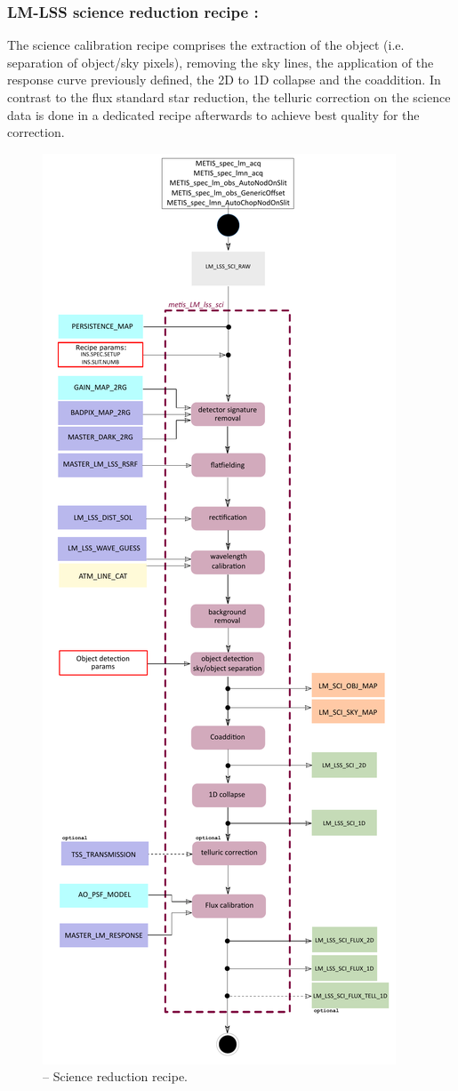 \subsubsection{LM-LSS science reduction recipe :}\label{rec:lsslmsci}
The science calibration recipe comprises the extraction of the object (i.e. separation of object/sky pixels), removing the sky lines, the application of the response curve previously defined, the 2D to 1D collapse and the coaddition. In contrast to the flux standard star reduction, the telluric correction on the science data is done in a dedicated recipe afterwards to achieve best quality for the correction.
\begin{figure}[ht]
  \centering
  \includegraphics[width=0.37\textheight]{figures/metis_lm_lss_sci_v0.81.pdf}
  \caption[Recipe: ]{ --
    Science reduction recipe.}
  \label{Fig:rec_lm_lss_sci}
\end{figure}
